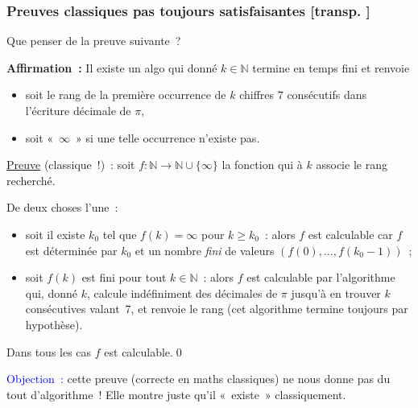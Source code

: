 \documentclass[mathserif,a4paper,aspectratio=169]{beamer}
\renewcommand{\frametitle}[1]{\subsubsection*{#1 {\footnotesize[transp. \insertframenumber]}}}
\begin{document}
\begin{frame}
\frametitle{Preuves classiques pas toujours satisfaisantes}

Que penser de la preuve suivante ?

\medskip

\textbf{Affirmation :} Il existe un algo qui donné $k \in
\mathbb{N}$ \alert{termine en temps fini} et renvoie
\begin{itemize}
\item soit le rang de la première occurrence de $k$ chiffres $7$
  consécutifs dans l'écriture décimale de $\pi$,
\item soit « $\infty$ » si une telle occurrence n'existe pas.
\end{itemize}

\medskip

{\footnotesize

\underline{Preuve} (classique !) : soit $f\colon \mathbb{N} \to
\mathbb{N} \cup \{\infty\}$ la fonction qui à $k$ associe le rang
recherché.

\alert{De deux choses l'une :}
\begin{itemize}
\item soit il existe $k_0$ tel que $f(k) = \infty$ pour $k\geq k_0$ :
  alors $f$ est calculable car $f$ est déterminée par $k_0$ et un
  nombre \emph{fini} de valeurs $(f(0),\ldots,f(k_0-1))$ ;
\item soit $f(k)$ est fini pour tout $k \in \mathbb{N}$ : alors $f$
  est calculable par l'algorithme qui, donné $k$, calcule indéfiniment
  des décimales de $\pi$ jusqu'à en trouver $k$ consécutives
  valant $7$, et renvoie le rang (cet algorithme termine toujours par
  hypothèse).
\end{itemize}

Dans tous les cas $f$ est calculable.\qed
\par}

\medskip

\textcolor{blue}{Objection :} cette preuve (correcte en maths
classiques) ne nous donne pas du tout d'algorithme !  Elle montre
juste qu'il « existe » classiquement.

\end{frame}
%
\end{document}
